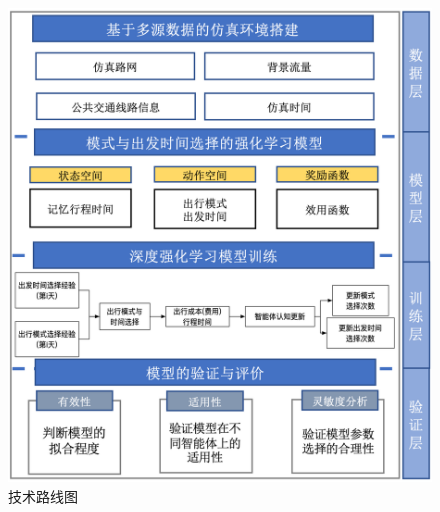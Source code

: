 \begin{figure}[htbp]
  \centering
  \includegraphics[width=0.92\linewidth]{figures/content/flowchart.png}
  \caption{技术路线图}
  \label{flowchart}
\end{figure}